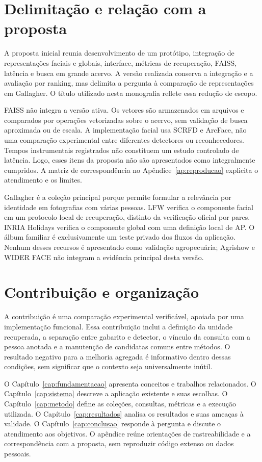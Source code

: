 \section{Delimitação e relação com a proposta}
A proposta inicial reunia desenvolvimento de um protótipo, integração de representações faciais e globais, interface, métricas de recuperação, FAISS, latência e busca em grande acervo. A versão realizada conserva a integração e a avaliação por ranking, mas delimita a pergunta à comparação de representações em Gallagher. O título utilizado nesta monografia reflete essa redução de escopo.

FAISS não integra a versão ativa. Os vetores são armazenados em arquivos e comparados por operações vetorizadas sobre o acervo, sem validação de busca aproximada ou de escala. A implementação facial usa SCRFD e ArcFace, não uma comparação experimental entre diferentes detectores ou reconhecedores. Tempos instrumentais registrados não constituem um estudo controlado de latência. Logo, esses itens da proposta não são apresentados como integralmente cumpridos. A matriz de correspondência no Apêndice~\ref{ap:reproducao} explicita o atendimento e os limites.

Gallagher é a coleção principal porque permite formular a relevância por identidade em fotografias com várias pessoas. LFW verifica o componente facial em um protocolo local de recuperação, distinto da verificação oficial por pares. INRIA Holidays verifica o componente global com uma definição local de AP. O álbum familiar é exclusivamente um teste privado dos fluxos da aplicação. Nenhum desses recursos é apresentado como validação agropecuária; Agrishow e WIDER FACE não integram a evidência principal desta versão.

\section{Contribuição e organização}
A contribuição é uma comparação experimental verificável, apoiada por uma implementação funcional. Essa contribuição inclui a definição da unidade recuperada, a separação entre gabarito e detector, o vínculo da consulta com a pessoa anotada e a manutenção de candidatas comuns entre métodos. O resultado negativo para a melhoria agregada é informativo dentro dessas condições, sem significar que o contexto seja universalmente inútil.

O Capítulo~\ref{cap:fundamentacao} apresenta conceitos e trabalhos relacionados. O Capítulo~\ref{cap:sistema} descreve a aplicação existente e suas escolhas. O Capítulo~\ref{cap:metodo} define as coleções, consultas, métricas e a execução utilizada. O Capítulo~\ref{cap:resultados} analisa os resultados e suas ameaças à validade. O Capítulo~\ref{cap:conclusao} responde à pergunta e discute o atendimento aos objetivos. O apêndice reúne orientações de rastreabilidade e a correspondência com a proposta, sem reproduzir código extenso ou dados pessoais.

